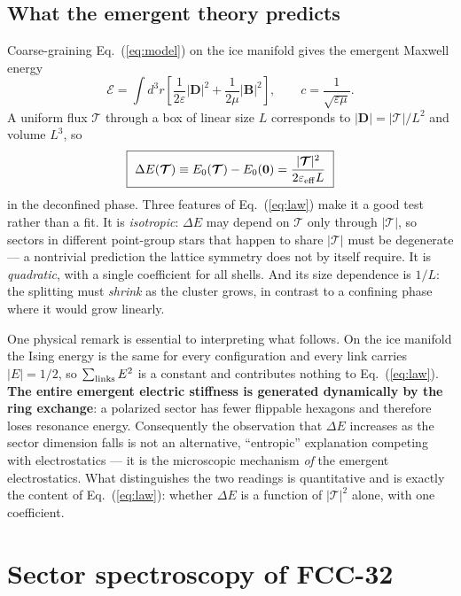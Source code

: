 \documentclass[aps,prb,preprint,amsmath,amssymb,superscriptaddress,
longbibliography,floatfix]{revtex4-2}
\DeclareRobustCommand{\bT}{\bm{\mathcal T}}
\begin{document}
\subsection{What the emergent theory predicts}

Coarse-graining Eq.~(\ref{eq:model}) on the ice manifold gives the emergent
Maxwell energy
\begin{equation}
 \mathcal E=\int d^3r\left[\frac{1}{2\varepsilon}|\bm D|^2
 +\frac{1}{2\mu}|\bm B|^2\right],\qquad c=\frac{1}{\sqrt{\varepsilon\mu}} .
 \label{eq:maxwell}
\end{equation}
A uniform flux $\bT$ through a box of linear size $L$ corresponds to
$|\bm D|=|\bT|/L^2$ and volume $L^3$, so
\begin{equation}
 \boxed{\ \Delta E(\bT)\equiv E_0(\bT)-E_0(\bm 0)
 =\frac{|\bT|^2}{2\varepsilon_{\rm eff}L}\ }
 \label{eq:law}
\end{equation}
in the deconfined phase.  Three features of Eq.~(\ref{eq:law}) make it a good
test rather than a fit.  It is \emph{isotropic}: $\Delta E$ may depend on $\bT$
only through $|\bT|$, so sectors in different point-group stars that happen to
share $|\bT|$ must be degenerate --- a nontrivial prediction the lattice
symmetry does not by itself require.  It is \emph{quadratic}, with a single
coefficient for all shells.  And its size dependence is $1/L$: the splitting
must \emph{shrink} as the cluster grows, in contrast to a confining phase where
it would grow linearly.

One physical remark is essential to interpreting what follows.  On the ice
manifold the Ising energy is the same for every configuration and every link
carries $|E|=1/2$, so $\sum_{\rm links}E^2$ is a constant and contributes
nothing to Eq.~(\ref{eq:law}).  \textbf{The entire emergent electric stiffness
is generated dynamically by the ring exchange}: a polarized sector has fewer
flippable hexagons and therefore loses resonance energy.  Consequently the
observation that $\Delta E$ increases as the sector dimension falls is not an
alternative, ``entropic'' explanation competing with electrostatics --- it is
the microscopic mechanism \emph{of} the emergent electrostatics.  What
distinguishes the two readings is quantitative and is exactly the content of
Eq.~(\ref{eq:law}): whether $\Delta E$ is a function of $|\bT|^2$ alone, with
one coefficient.

\section{Sector spectroscopy of FCC-32}
\label{sec:results}
\end{document}
